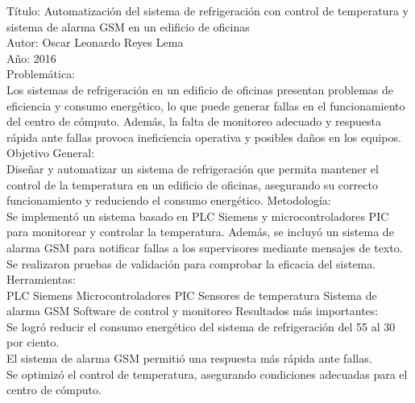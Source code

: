 Título: Automatización del sistema de refrigeración con control de temperatura y sistema de alarma GSM en un edificio de oficinas \\
Autor: Oscar Leonardo Reyes Lema \\
Año: 2016 \\
Problemática: \\
Los sistemas de refrigeración en un edificio de oficinas presentan problemas de eficiencia y consumo energético, lo que puede generar fallas en el funcionamiento del centro de cómputo. Además, la falta de monitoreo adecuado y respuesta rápida ante fallas provoca ineficiencia operativa y posibles daños en los equipos.\\
Objetivo General: \\
Diseñar y automatizar un sistema de refrigeración que permita mantener el control de la temperatura en un edificio de oficinas, asegurando su correcto funcionamiento y reduciendo el consumo energético.
Metodología: \\
Se implementó un sistema basado en PLC Siemens y microcontroladores PIC para monitorear y controlar la temperatura. Además, se incluyó un sistema de alarma GSM para notificar fallas a los supervisores mediante mensajes de texto. Se realizaron pruebas de validación para comprobar la eficacia del sistema.\\
Herramientas: \\
PLC Siemens
Microcontroladores PIC
Sensores de temperatura
Sistema de alarma GSM
Software de control y monitoreo
Resultados más importantes: \\
Se logró reducir el consumo energético del sistema de refrigeración del 55 al 30 por ciento.\\
El sistema de alarma GSM permitió una respuesta más rápida ante fallas.\\
Se optimizó el control de temperatura, asegurando condiciones adecuadas para el centro de cómputo.\\

